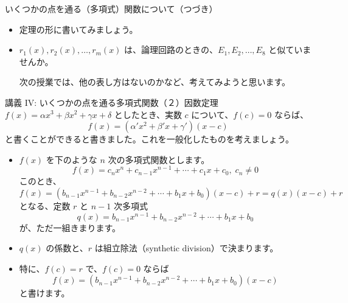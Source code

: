 \documentclass[10pt, dvipdfmx]{beamer}
\begin{document}
\begin{frame}{いくつかの点を通る（多項式）関数について（つづき）}
\begin{itemize}
\item 定理の形に書いてみましょう。

\bigskip
\item \(r_1(x), r_2(x), \ldots, r_m(x)\) は、論理回路のときの、\(E_1, E_2, \ldots, E_8\) と似ていませんか。\par

\bigskip
次の授業では、他の表し方はないのかなど、考えてみようと思います。\par
\end{itemize}
\end{frame}
\begin{frame}{講義 IV: いくつかの点を通る多項式関数（２）}{因数定理}
\(f(x) = \alpha x^3 + \beta x^2 + \gamma x + \delta\) としたとき、実数 \(c\) について、\(f(c)=0\) ならば、 
\[ f(x) = (\alpha' x^2 + \beta' x + \gamma')(x-c) \]   と書くことができると書きました。これを一般化したものを考えましょう。\par
\begin{itemize}
\item \(f(x)\) を下のような \(n\) 次の多項式関数とします。
\[ f(x) = c_nx^n + c_{n-1}x^{n-1} + \cdots + c_1x+c_0, \; c_n \neq 0 \] このとき、
\[ f(x) = (b_{n-1}x^{n-1}+ b_{n-2}x^{n-2} + \cdots + b_1x + b_0)(x-c) + r = q(x)(x-c) + r \] となる、定数 \(r\) と \(n-1\) 次多項式 
\[ q(x) = b_{n-1}x^{n-1}+ b_{n-2}x^{n-2} + \cdots + b_1x + b_0 \] が、ただ一組きまります。
\item \(q(x)\) の係数と、\(r\) は組立除法（synthetic division）で決まります。
\item 特に、\(f(c) = r\) で、\(f(c)=0\) ならば 
\[ f(x) = (b_{n-1}x^{n-1}+ b_{n-2}x^{n-2} + \cdots + b_1x + b_0)(x-c) \] 
と書けます。
\end{itemize}
\end{frame}
\end{document}
